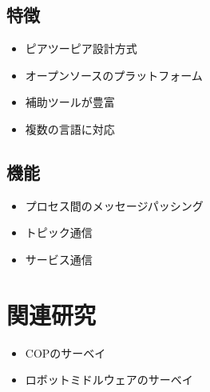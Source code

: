 \subsection{特徴}

\begin{itemize}
 \item ピアツーピア設計方式
 \item オープンソースのプラットフォーム
 \item 補助ツールが豊富
 \item 複数の言語に対応
\end{itemize}

\subsection{機能}

\begin{itemize}
 \item プロセス間のメッセージパッシング
 \item トピック通信
 \item サービス通信
\end{itemize}

\section{関連研究}

\begin{itemize}
 \item COPのサーベイ
 \item ロボットミドルウェアのサーベイ
\end{itemize}


